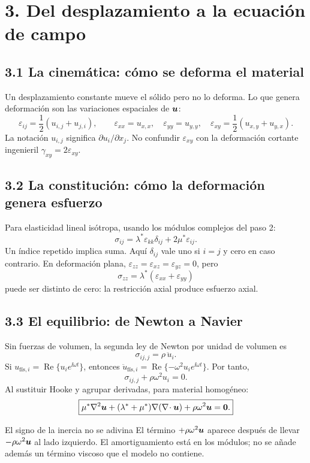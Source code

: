 \documentclass[11pt]{article}
\begin{document}
\newpage
\section*{3. Del desplazamiento a la ecuación de campo}
\subsection*{3.1 La cinemática: cómo se deforma el material}
Un desplazamiento constante mueve el sólido pero no lo deforma. Lo que genera
deformación son las variaciones espaciales de \(\bm{u}\):
\[
 \varepsilon_{ij}=\frac12(u_{i,j}+u_{j,i}),\qquad
 \varepsilon_{xx}=u_{x,x},\quad
 \varepsilon_{yy}=u_{y,y},\quad
 \varepsilon_{xy}=\frac12(u_{x,y}+u_{y,x}).
\]
La notación \(u_{i,j}\) significa \(\partial u_i/\partial x_j\).
No confundir \(\varepsilon_{xy}\) con la deformación cortante ingenieril
\(\gamma_{xy}=2\varepsilon_{xy}\).

\subsection*{3.2 La constitución: cómo la deformación genera esfuerzo}
Para elasticidad lineal isótropa, usando los módulos complejos del paso 2:
\[
 \boxed{\sigma_{ij}=\lambda^* \varepsilon_{kk}\delta_{ij}
                  +2\mu^*\varepsilon_{ij}.}
\]
Un índice repetido implica suma. Aquí \(\delta_{ij}\) vale uno si \(i=j\)
y cero en caso contrario. En deformación plana,
\(\varepsilon_{zz}=\varepsilon_{xz}=\varepsilon_{yz}=0\), pero
\[
 \sigma_{zz}=\lambda^*(\varepsilon_{xx}+\varepsilon_{yy})
\]
puede ser distinto de cero: la restricción axial produce esfuerzo axial.

\subsection*{3.3 El equilibrio: de Newton a Navier}
Sin fuerzas de volumen, la segunda ley de Newton por unidad de volumen es
\[
 \sigma_{ij,j}=\rho\,\ddot u_i.
\]
Si \(u_{\text{fís},i}=\operatorname{Re}\{u_i e^{\ii\omega t}\}\), entonces
\(\ddot u_{\text{fís},i}=\operatorname{Re}\{-\omega^2u_i e^{\ii\omega t}\}\).
Por tanto,
\[
 \boxed{\sigma_{ij,j}+\rho\omega^2u_i=0.}
\]
Al sustituir Hooke y agrupar derivadas, para material homogéneo:
\[
 \boxed{\mu^*\nabla^2\bm{u}+
 (\lambda^*+\mu^*)\nabla(\nabla\!\cdot\bm{u})
 +\rho\omega^2\bm{u}=\bm{0}.}
\]
\begin{alerta}{El signo de la inercia no se adivina}
El término \(+\rho\omega^2\bm{u}\) aparece después de llevar
\(-\rho\omega^2\bm{u}\) al lado izquierdo. El amortiguamiento está en los
módulos; no se añade además un término viscoso que el modelo no contiene.
\end{alerta}
\end{document}
